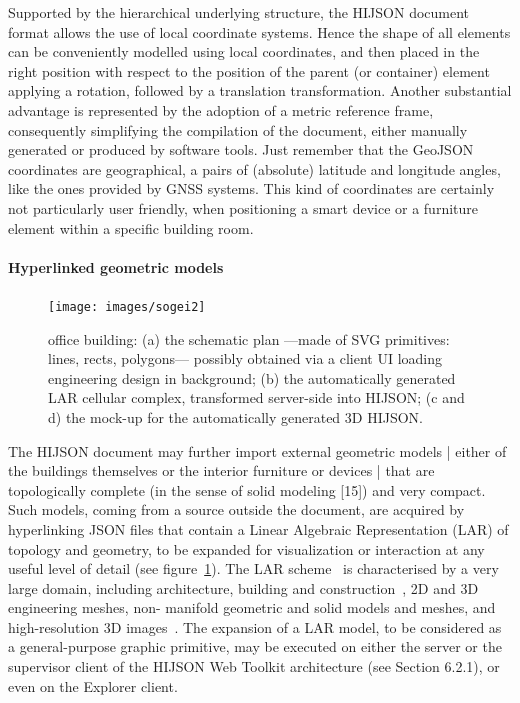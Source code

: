 \documentclass{sig-alternate}
\begin{document}
Supported by the hierarchical underlying structure, the HIJSON document format
allows the use of local coordinate systems. Hence the shape of all elements
can be conveniently modelled using local coordinates, and then placed in the
right position with respect to the position of the parent (or container)
element applying a rotation, followed by a translation transformation. Another
substantial advantage is represented by the adoption of a metric reference
frame, consequently simplifying the compilation of the document, either
manually generated or produced by software tools. Just remember that the
GeoJSON coordinates are geographical, a pairs of (absolute) latitude and
longitude angles, like the ones provided by GNSS systems. This kind of
coordinates are certainly not particularly user friendly, when positioning a
smart device or a furniture element within a specific building room.

\paragraph{Hyperlinked geometric models}

\begin{figure}[h]
 \centering
 \texttt{[image: images/sogei2]} 
 \caption{office building: 
 (a) the schematic plan ---made of SVG primitives: 
 lines, rects, polygons--- possibly obtained via a client UI 
 loading engineering design in background;
 (b) the automatically generated LAR cellular complex, transformed 
 server-side into HIJSON; 
 (c and d) the mock-up for the automatically generated 3D HIJSON.
 }
 \label{fig:sogei}
\end{figure}

The HIJSON document may further import external geometric models | either of
the buildings themselves or the interior furniture or devices | that are
topologically complete (in the sense of solid modeling [15]) and very compact.
Such models, coming from a source outside the document, are acquired by
hyperlinking JSON files that contain a Linear Algebraic Representation (LAR)
of topology and geometry, to be expanded for visualization or interaction at
any useful level of detail (see figure~\ref{fig:sogei}). The LAR
scheme~\cite{Dicarlo:2014:TNL:2543138.2543294} is characterised by a very
large domain, including architecture, building and
construction~\cite{paoluzziMS:2014}, 2D and 3D engineering meshes, non-
manifold geometric and solid models and meshes, and high-resolution 3D
images~\cite{cadanda:2015}.  The expansion of a LAR model, to be considered as
a general-purpose graphic primitive, may be executed on either the server or
the supervisor client of the HIJSON Web Toolkit architecture (see Section
6.2.1), or even on the Explorer client.
\end{document}
